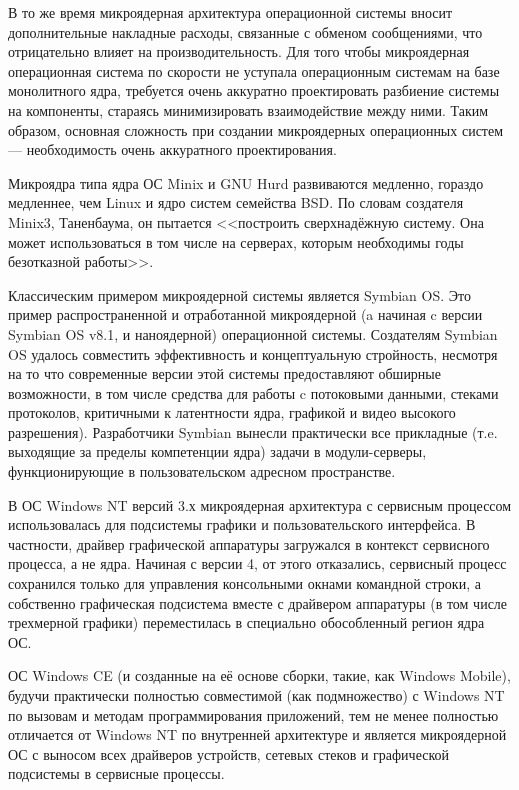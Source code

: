 В то же время микроядерная архитектура операционной системы вносит дополнительные накладные расходы, связанные с обменом сообщениями, что отрицательно влияет на производительность. Для того чтобы микроядерная операционная система по скорости не уступала операционным системам на базе монолитного ядра, требуется очень аккуратно проектировать разбиение системы на компоненты, стараясь минимизировать взаимодействие между ними. Таким образом, основная сложность при создании микроядерных операционных систем --- необходимость очень аккуратного проектирования.

Микроядра типа ядра ОС Minix и GNU Hurd развиваются медленно, гораздо медленнее, чем Linux и ядро систем семейства BSD. По словам создателя Minix3, Таненбаума, он пытается <<построить сверхнадёжную систему. Она может использоваться в том числе на серверах, которым необходимы годы безотказной работы>>.

Классическим примером микроядерной системы является Symbian OS. Это пример распространенной и отработанной микроядерной (a начиная c версии Symbian OS v8.1, и наноядерной) операционной системы. Создателям Symbian OS удалось совместить эффективность и концептуальную стройность, несмотря на то что современные версии этой системы предоставляют обширные возможности, в том числе средства для работы c потоковыми данными, стеками протоколов, критичными к латентности ядра, графикой и видео высокого разрешения). Разработчики Symbian вынесли практически все прикладные (т.e. выходящие за пределы компетенции ядра) задачи в модули-серверы, функционирующие в пользовательском адресном пространстве.

В ОС Windows NT версий 3.х микроядерная архитектура с сервисным процессом использовалась для подсистемы графики и пользовательского интерфейса. В частности, драйвер графической аппаратуры загружался в контекст сервисного процесса, а не ядра. Начиная с версии 4, от этого отказались, сервисный процесс сохранился только для управления консольными окнами командной строки, а собственно графическая подсистема вместе с драйвером аппаратуры (в том числе трехмерной графики) переместилась в специально обособленный регион ядра ОС.

ОС Windows CE (и созданные на её основе сборки, такие, как Windows Mobile), будучи практически полностью совместимой (как подмножество) с Windows NT по вызовам и методам программирования приложений, тем не менее полностью отличается от Windows NT по внутренней архитектуре и является микроядерной ОС с выносом всех драйверов устройств, сетевых стеков и графической подсистемы в сервисные процессы.

